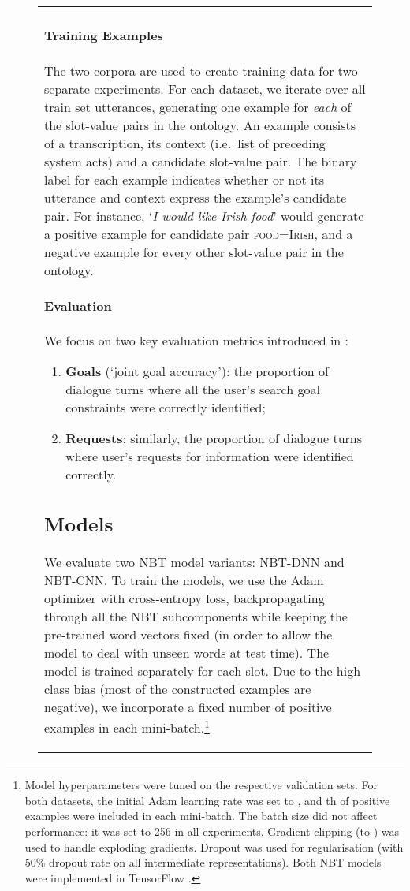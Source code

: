 \documentclass[11pt,a4paper]{article}
\begin{document}
\begin{figure}
{\begin{tabular}{p{9cm}}
\begin{enumerate}
\end{enumerate}

\paragraph{Training Examples} The two corpora are used to create training data for two separate experiments. For each dataset, we iterate over all train set utterances, generating one example for \emph{each} of the slot-value pairs in the ontology. An example consists of a transcription, its context (i.e.~list of preceding system acts) and a candidate slot-value pair. The binary label for each example indicates whether or not its utterance and context express the example's candidate pair. For instance, `\emph{I would like Irish food}' would generate a positive example for candidate pair \textsc{food={Irish}}, and a negative example for every other slot-value pair in the ontology.   


\paragraph{Evaluation} We focus on two key evaluation metrics introduced in \cite{Henderson:14a}: \vspace{-0mm}
\begin{enumerate}
\item \textbf{Goals} (`joint goal accuracy'): the proportion of dialogue turns where all the user's search goal constraints were correctly identified; \vspace{-0mm}
\item \textbf{Requests}: similarly, the proportion of dialogue turns where user's requests for information were identified correctly. \vspace{-0mm}
\end{enumerate}


\subsection{Models}

We evaluate two NBT model variants: \textsc{NBT-DNN} and \textsc{NBT-CNN}. To train the models, we use the Adam optimizer \cite{Adam:15} with cross-entropy loss, backpropagating through all the NBT subcomponents while keeping the pre-trained word vectors fixed (in order to allow the model to deal with unseen words at test time). The model is trained separately for each slot. Due to the high class bias (most of the constructed examples are negative), we incorporate a fixed number of positive examples in each mini-batch.\footnote{Model hyperparameters were tuned on the respective validation sets.  For both datasets, the initial Adam learning rate was set to , and th of positive examples were included in each mini-batch. The batch size did not affect performance: it was set to 256 in all experiments. Gradient clipping (to ) was used to handle exploding gradients. Dropout \cite{Srivastava:2014} was used for regularisation (with 50\% dropout rate on all intermediate representations). Both \textsc{NBT} models were implemented in TensorFlow \cite{tf:15}. } 




\end{tabular}}
\end{figure}
\end{document}
